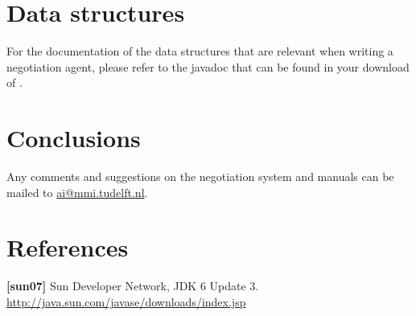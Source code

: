 \documentclass[]{article}
\begin{document}
\section{Data structures}
For the documentation of the data structures that are relevant when writing a negotiation agent, please refer to the javadoc that can be found in your download of \Genius. 
 
\section{Conclusions}
Any comments and suggestions on the negotiation system and manuals can be mailed to \url{ai@mmi.tudelft.nl}.

\section{References}
\textbf{[sun07]} Sun Developer Network, JDK 6 Update 3. \url{http://java.sun.com/javase/downloads/index.jsp}

%
%
\end{document}
